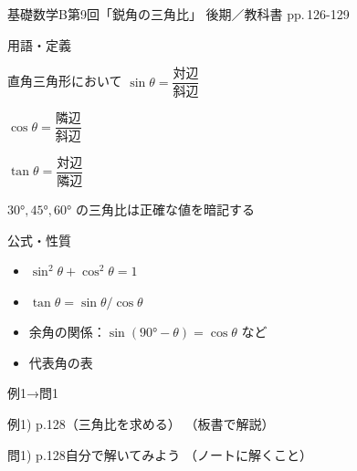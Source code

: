 \documentclass[aspectratio=43,professionalfonts,handout]{beamer}
\newcommand{\LectureNum}{9}
\newcommand{\LectureTitle}{鋭角の三角比}
\newcommand{\TextPages}{pp.\,126-129}
\newcommand{\CourseName}{基礎数学B}
\renewcommand{\TermName}{後期}
\begin{document}
\begin{frame}{\CourseName\quad 第\LectureNum 回「\LectureTitle 」}
  {\small \TermName\quad \TeacherName\quad ／\quad 教科書 \TextPages}

  \begin{block}{用語・定義}
  \begin{description}[labelwidth=5.5em]
    \item[\kw{$\sin\theta = \text{対辺}/\text{斜辺}$}] 直角三角形において $\sin\theta = \dfrac{\text{対辺}}{\text{斜辺}}$
    \item[\kw{$\cos\theta = \text{隣辺}/\text{斜辺}$}] $\cos\theta = \dfrac{\text{隣辺}}{\text{斜辺}}$
    \item[\kw{$\tan\theta = \text{対辺}/\text{隣辺}$}] $\tan\theta = \dfrac{\text{対辺}}{\text{隣辺}}$
    \item[\kw{$30°$・$45°$・$60°$ の三角比}] $30°, 45°, 60°$ の三角比は正確な値を暗記する
  \end{description}
  \end{block}
\end{frame}

\begin{frame}{公式・性質}
  \begin{block}{}
  \begin{itemize}
    \item $\sin^2\theta + \cos^2\theta = 1$
    \item $\tan\theta = \sin\theta / \cos\theta$
    \item 余角の関係：$\sin(90° - \theta) = \cos\theta$ など
    \item 代表角の表
  \end{itemize}
  \end{block}
\end{frame}

\begin{frame}{例1→問1}
  \begin{exampleblock}{例1) p.128（三角比を求める）}
    （板書で解説）
  \end{exampleblock}

  \vfill

  \begin{block}{問1) p.128\quad 自分で解いてみよう}
    （ノートに解くこと）
  \end{block}
\end{frame}
\end{document}
